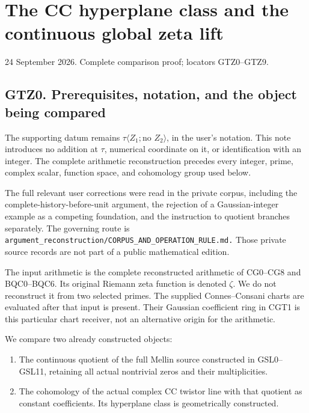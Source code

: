 \section{The CC hyperplane class and the continuous global zeta
lift}\label{the-cc-hyperplane-class-and-the-continuous-global-zeta-lift}

24 September 2026. Complete comparison proof; locators GTZ0--GTZ9.

\subsection{GTZ0. Prerequisites, notation, and the object being
compared}\label{gtz0.-prerequisites-notation-and-the-object-being-compared}

The supporting datum remains \(\tau\langle Z_1;\text{no }Z_2\rangle\),
in the user's notation. This note introduces no addition at \(\tau\),
numerical coordinate on it, or identification with an integer. The
complete arithmetic reconstruction precedes every integer, prime,
complex scalar, function space, and cohomology group used below.

The full relevant user corrections were read in the private corpus,
including the complete-history-before-unit argument, the rejection of a
Gaussian-integer example as a competing foundation, and the instruction
to quotient branches separately. The governing route is
\nolinkurl{argument_reconstruction/CORPUS_AND_OPERATION_RULE.md.} Those
private source records are not part of a public mathematical edition.

The input arithmetic is the complete reconstructed arithmetic of
CG0--CG8 and BQC0--BQC6. Its original Riemann zeta function is denoted
\(\zeta\). We do not reconstruct it from two selected primes. The
supplied Connes--Consani charts are evaluated after that input is
present. Their Gaussian coefficient ring in CGT1 is this particular
chart receiver, not an alternative origin for the arithmetic.

We compare two already constructed objects:

\begin{enumerate}
\def\labelenumi{\arabic{enumi}.}
\tightlist
\item
  The continuous quotient of the full Mellin source constructed in
  GSL0--GSL11, retaining all actual nontrivial zeros and their
  multiplicities.
\item
  The cohomology of the actual complex CC twistor line with that
  quotient as constant coefficients. Its hyperplane class is
  geometrically constructed.
\end{enumerate}

